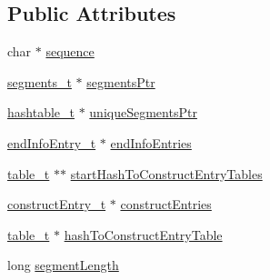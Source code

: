 \subsection*{Public Attributes}
\begin{DoxyCompactItemize}
\item 
char $\ast$ \hyperlink{structsequencer_a242c4081f37000b0284d4f82ae9b866f}{sequence}
\item 
\hyperlink{segments_8h_a6b833f170e932d51264176fcd9dd0bed}{segments\-\_\-t} $\ast$ \hyperlink{structsequencer_af4e78d0446222af1d6ace66141ed8e90}{segments\-Ptr}
\item 
\hyperlink{hashtable_8h_a07e36569668e35018fe256a44252be1c}{hashtable\-\_\-t} $\ast$ \hyperlink{structsequencer_abbe1f69d46c1485a043a44e88ca06b91}{unique\-Segments\-Ptr}
\item 
\hyperlink{sequencer_8h_a97c0cad60d1045ed2f1ea7a75f316da6}{end\-Info\-Entry\-\_\-t} $\ast$ \hyperlink{structsequencer_a52bc9f9c4549660088adcff18b3a4889}{end\-Info\-Entries}
\item 
\hyperlink{table_8h_aa56ca1db81617008d1449296b01f0db7}{table\-\_\-t} $\ast$$\ast$ \hyperlink{structsequencer_afdfe81e251fb4779168c7c587ac12e18}{start\-Hash\-To\-Construct\-Entry\-Tables}
\item 
\hyperlink{sequencer_8h_a63dad4594fb66e820886404f1fa9fe98}{construct\-Entry\-\_\-t} $\ast$ \hyperlink{structsequencer_a94f565cde56e23672baa94dbaedff101}{construct\-Entries}
\item 
\hyperlink{table_8h_aa56ca1db81617008d1449296b01f0db7}{table\-\_\-t} $\ast$ \hyperlink{structsequencer_a7566d0afffb7378bcd1d54b4969da7eb}{hash\-To\-Construct\-Entry\-Table}
\item 
long \hyperlink{structsequencer_afaaf7dc2e82a67563d52ffb3b2c0541a}{segment\-Length}
\end{DoxyCompactItemize}


